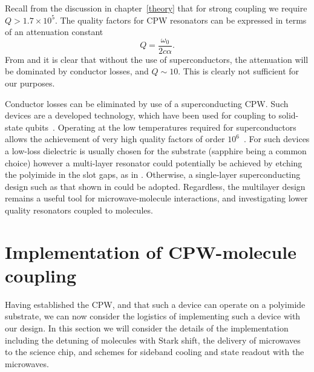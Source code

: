 Recall from the discussion in chapter~\ref{theory} that for strong coupling we
require $Q > 1.7 \times 10^5$. The quality factors for CPW resonators can be
expressed in terms of an attenuation constant
%
\begin{equation}
  Q = \frac{\omega_0}{2c\alpha}.
  \label{mws:eqn:Qalpha}
\end{equation}
%
From  and  it is
clear that without the use of superconductors, the attenuation will be
dominated by conductor losses, and $Q\sim10$. This is clearly not sufficient
for our purposes.

Conductor losses can be eliminated by use of a superconducting CPW. Such
devices are a developed technology, which have been used for coupling to
solid-state qubits~\cite{Wallraff2004}. Operating at the low temperatures
required for superconductors allows the achievement of very high quality
factors of order $10^6$~\cite{doi:10.1063/1.3552890, Day2003}. For such devices
a low-loss dielectric is usually chosen for the substrate (sapphire being a
common choice) however a multi-layer resonator could potentially be achieved by
etching the polyimide in the slot gaps, as in . Otherwise, a
single-layer superconducting design such as that shown in
 could be adopted. Regardless, the multilayer design
remains a useful tool for microwave-molecule interactions, and investigating
lower quality resonators coupled to molecules. 


\section{Implementation of CPW-molecule coupling}
\label{mws:integrating}

Having established the CPW, and that such a device can operate on a polyimide
substrate, we can now consider the logistics of implementing such a device
with our design. In this section we will consider the details of the
implementation including the detuning of molecules with Stark shift, the
delivery of microwaves to the science chip, and schemes for sideband cooling
and state readout with the microwaves.

